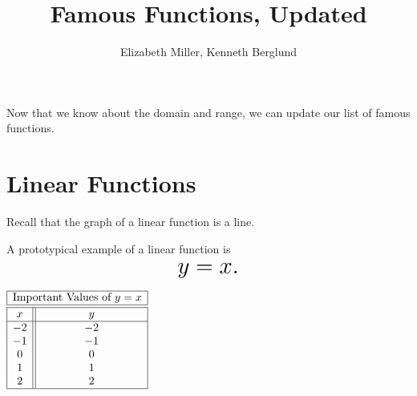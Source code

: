 \documentclass[nooutcomes]{ximera}
\author{Elizabeth Miller, Kenneth Berglund}
\title{Famous Functions, Updated}
\begin{document}
\begin{abstract}
\end{abstract}
\maketitle


Now that we know about the domain and range, we can update our list of famous functions. 

\newpage


\section{Linear Functions}
Recall that the graph of a linear function is a line. 

\begin{example}
A prototypical example of a linear function is $$ \mbox{\huge $y=x.$}$$ 

\begin{image}
\end{image}

\begin{center}
\(
\begin{array}{ |c || c|  }
 \hline
 \multicolumn{2}{|c|}{\text{\normalfont Important Values of } y=x} \\
\hline
 \hline
 x & y\\
 \hline
 -2&-2\\
 -1&-1\\
 0&0\\
 1&1\\
 2&2\\
 \hline
\end{array}
\)
\end{center}
\end{example}
\end{document}
